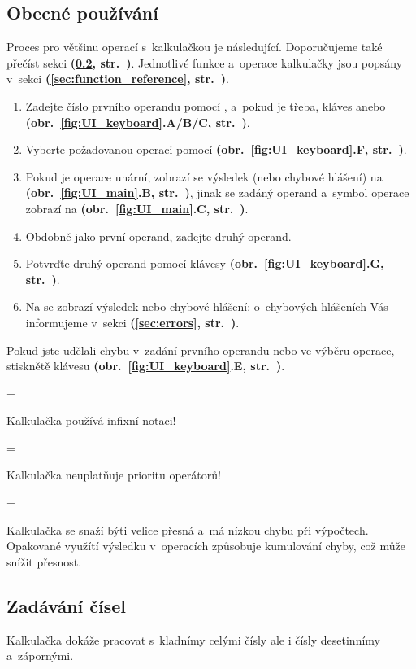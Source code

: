 \documentclass[a5paper,8pt,twoside]{extarticle}
\newenvironment{warningBox}
  {\par\begin{mdframed}[linewidth=1pt,linecolor=black]%
    \begin{list}{}{\leftmargin=1cm
                   \labelwidth=\leftmargin}\item[\Large\warning]}
  {\end{list}\end{mdframed}\par}
\newenvironment{infoBox}
  {\par\begin{mdframed}[linewidth=1pt,linecolor=black]%
    \begin{list}{}{\leftmargin=1cm
                   \labelwidth=\leftmargin}\item[\Large\lefthand]}
  {\end{list}\end{mdframed}\par}
\newcommand*\joinBox{\vspace{-0.9em}}
\newcommand*\nref[1]{\textbf{(\ref{#1}, str.~\pageref{#1})}}
\newcommand*\fref[2]{\textbf{(obr.~\ref{#1}#2, str.~\pageref{#1})}}
\begin{document}
    \subsection{Obecné používání}
    \label{sec:general_use}
    Proces pro většinu operací s~kalkulačkou je následující. Doporučujeme také přečíst sekci  \nref{sec:entering_numbers}. Jednotlivé funkce a~operace kalkulačky jsou popsány v~sekci  \nref{sec:function_reference}.
    \begin{enumerate}
        \item Zadejte číslo prvního operandu pomocí , a~pokud je třeba, kláves  anebo  \fref{fig:UI_keyboard}{.A/B/C}.
        \item Vyberte požadovanou operaci pomocí  \fref{fig:UI_keyboard}{.F}.
        \item Pokud je operace unární, zobrazí se výsledek (nebo chybové hlášení) na  \fref{fig:UI_main}{.B}, jinak se zadáný operand a~symbol operace zobrazí na  \fref{fig:UI_main}{.C}.
        \item Obdobně jako první operand, zadejte druhý operand.
        \item Potvrďte druhý operand pomocí klávesy  \fref{fig:UI_keyboard}{.G}.
        \item Na  se zobrazí výsledek nebo chybové hlášení; o~chybových hlášeních Vás informujeme v~sekci  \nref{sec:errors}.
    \end{enumerate}
    Pokud jste udělali chybu v~zadání prvního operandu nebo ve výběru operace, stisknětě klávesu  \fref{fig:UI_keyboard}{.E}.
    \begin{infoBox}
        Kalkulačka používá infixní notaci!
    \end{infoBox}
    \joinBox
    \begin{infoBox}
        Kalkulačka neuplatňuje prioritu operátorů!
    \end{infoBox}
    \joinBox
    \begin{warningBox}
        Kalkulačka se snaží býti velice přesná a~má nízkou chybu při výpočtech. Opakované využítí výsledku v~operacích způsobuje kumulování chyby, což může snížit přesnost.
    \end{warningBox}
    \subsection{Zadávání čísel}
    \label{sec:entering_numbers}
    Kalkulačka dokáže pracovat s~kladnímy celými čísly ale i čísly desetinnímy a~zápornými.
\end{document}
